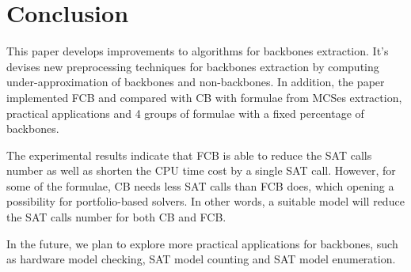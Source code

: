 \section{Conclusion}\label{sec:conc}
This paper develops improvements to algorithms for backbones extraction.
It's devises new preprocessing techniques for backbones extraction by computing under-approximation of backbones and non-backbones.
In addition, the paper implemented FCB and compared with CB with formulae from MCSes extraction, practical applications and 4 groups of formulae with a fixed percentage of backbones.

The experimental results indicate that FCB is able to reduce the SAT calls number as well as shorten the CPU time cost by a single SAT call.
However, for some of the formulae, CB needs less SAT calls than FCB does, which opening a possibility for portfolio-based solvers.
In other words, a suitable model will reduce the SAT calls number for both CB and FCB.

In the future, we plan to explore more practical applications for backbones, such as hardware model checking, SAT model counting and SAT model enumeration.

\newpage
